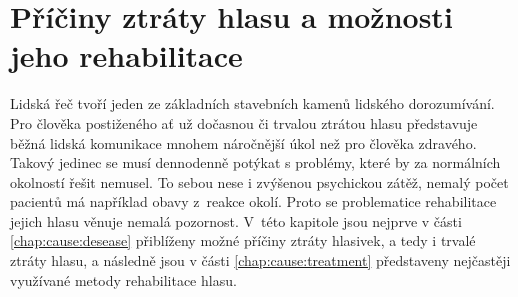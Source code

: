 \chapter{Příčiny ztráty hlasu a možnosti jeho rehabilitace}
\label{chap:cause}

Lidská řeč tvoří jeden ze základních stavebních kamenů lidského dorozumívání. Pro člověka
postiženého ať už dočasnou či trvalou ztrátou hlasu představuje běžná lidská
komunikace mnohem náročnější úkol než pro člověka zdravého. Takový jedinec se
musí dennodenně potýkat s problémy, které by za normálních okolností řešit
nemusel. To sebou nese %
i zvýšenou psychickou zátěž, nemalý počet pacientů má například obavy %
z~reakce okolí. Proto se problematice rehabilitace jejich 
hlasu věnuje nemalá pozornost. V~této kapitole jsou nejprve v části
\ref{chap:cause:desease} přiblíženy možné příčiny ztráty hlasivek, a tedy i
trvalé ztráty hlasu, a následně jsou v části \ref{chap:cause:treatment} představeny 
nejčastěji využívané metody rehabilitace hlasu.



% 
% 
